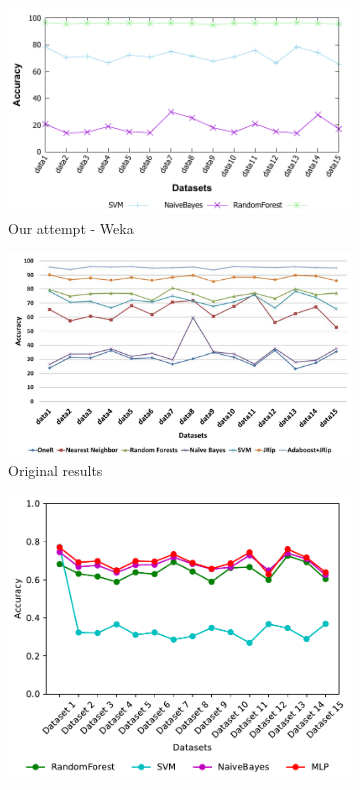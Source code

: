 \begin{figure}[H]
    \centering
    \begin{subfigure}[t]{110mm}
        \includegraphics[width=\linewidth]{images/weka_accuracy3}
        \caption{Our attempt - Weka}
    \end{subfigure}
    \begin{subfigure}[t]{110mm}
        \includegraphics[width=\linewidth]{images/weka_accuracy3_cite.png}
        \caption{Original results \cite{borges_hink_machine_2014-1}}
    \end{subfigure}
    \begin{subfigure}[t]{110mm}
        \includegraphics[width=\linewidth, page = 2]{images/accuracy}

\end{subfigure}
\end{figure}
